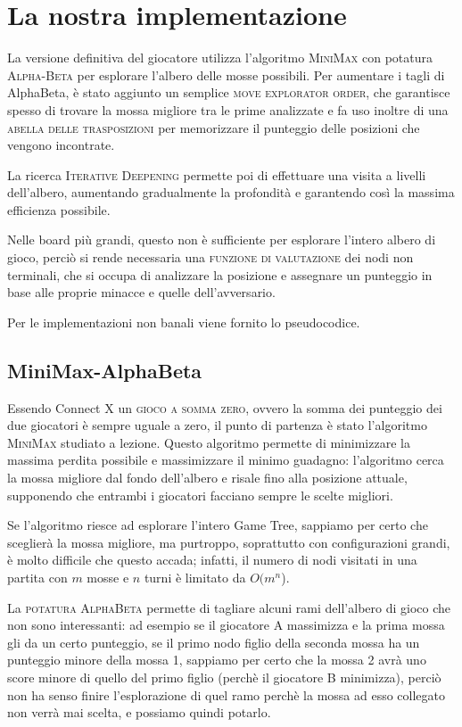 \documentclass{article}
\begin{document}
\section{La nostra implementazione}

La versione definitiva del giocatore utilizza l'algoritmo \textsc{MiniMax} con 
potatura \textsc{Alpha-Beta} per esplorare l'albero delle mosse possibili.
Per aumentare i tagli di AlphaBeta, è stato aggiunto un semplice \textsc{move explorator
order}, che garantisce spesso di trovare la mossa migliore tra le prime analizzate e
fa uso inoltre di una \textsc{abella delle trasposizioni} per memorizzare il
punteggio delle posizioni che vengono incontrate. 

La ricerca \textsc{Iterative Deepening}
permette poi di effettuare una visita a livelli dell'albero, aumentando gradualmente
la profondità e garantendo così la massima efficienza possibile.

Nelle board più grandi, questo non è sufficiente per esplorare l'intero albero di gioco,
perciò si rende necessaria una \textsc{funzione di valutazione} dei nodi non terminali, che
si occupa di analizzare la posizione e assegnare un punteggio in base alle proprie 
minacce e quelle dell'avversario.

Per le implementazioni non banali viene fornito lo pseudocodice.

\subsection{MiniMax-AlphaBeta}

Essendo Connect X un \textsc{gioco a somma zero}, ovvero la somma dei punteggio dei due giocatori
è sempre uguale a zero, il punto di partenza è stato l'algoritmo \textsc{MiniMax} studiato a lezione. 
Questo algoritmo permette di minimizzare la massima perdita possibile e massimizzare il minimo 
guadagno: l'algoritmo cerca la mossa migliore dal fondo dell'albero e risale fino alla posizione 
attuale, supponendo che entrambi i giocatori facciano sempre le scelte migliori.

Se l'algoritmo riesce ad esplorare l'intero Game Tree, sappiamo per certo che sceglierà la mossa 
migliore, ma purtroppo, soprattutto con configurazioni grandi, è molto difficile che questo accada; 
infatti, il numero di nodi visitati in una partita con $m$ mosse e $n$ turni è limitato da
$O(m^n$).

La \textsc{potatura AlphaBeta} permette di tagliare alcuni rami dell'albero di gioco che non sono 
interessanti: ad esempio se il giocatore A massimizza e la prima mossa gli da un certo punteggio, se
il primo nodo figlio della seconda mossa ha un punteggio minore della mossa 1, sappiamo per certo che
la mossa 2 avrà uno score minore di quello del primo figlio (perchè il giocatore B minimizza), 
perciò non ha senso finire l'esplorazione di quel ramo perchè la mossa ad esso collegato non verrà 
mai scelta, e possiamo quindi potarlo.
\end{document}
